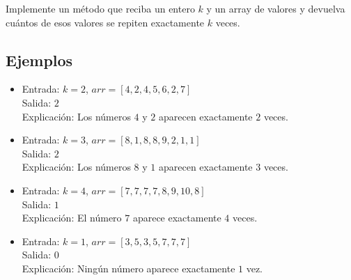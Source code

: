 Implemente un método que reciba un entero \(k\) y un array de valores y devuelva cuántos de esos valores se repiten exactamente \(k\) veces.

\subsection*{Ejemplos}
\begin{itemize}
    \item Entrada: \( k = 2 \), \( arr = [4, 2, 4, 5, 6, 2, 7] \) \\
          Salida: \( 2 \) \\
          Explicación: Los números \( 4 \) y \( 2 \) aparecen exactamente \( 2 \) veces.

    \item Entrada: \( k = 3 \), \( arr = [8, 1, 8, 8, 9, 2, 1, 1] \)\\
          Salida: \( 2 \)\\
          Explicación:  Los números \( 8 \) y \( 1 \) aparecen exactamente \( 3 \) veces.

    \item Entrada: \( k = 4 \), \( arr = [7, 7, 7, 7, 8, 9, 10, 8]\)\\
          Salida: \( 1 \) \\
          Explicación: El número \( 7 \) aparece exactamente \( 4 \) veces.

    \item Entrada: \( k = 1 \), \( arr = [3, 5, 3, 5, 7, 7, 7] \) \\
          Salida: \( 0 \)\\
          Explicación: Ningún número aparece exactamente \( 1 \) vez.
\end{itemize}